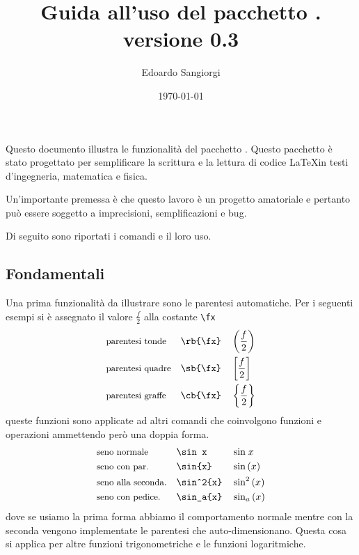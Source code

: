 \documentclass[11pt, a4paper ]{article}
\title{Guida all'uso del pacchetto \LaTeLib.\\[0.5em]  \large versione 0.3}
\author{Edoardo Sangiorgi}
\date{\today}
\def\fx{\frac{f}{2}}
\def\sh{\textbackslash}
\begin{document}
\maketitle
\noindent
Questo documento illustra le funzionalità del pacchetto \LaTeLib.
Questo pacchetto è stato progettato per semplificare la scrittura e la lettura di codice \LaTeX in testi d'ingegneria, matematica e fisica.

Un'importante premessa è che questo lavoro è un progetto amatoriale e pertanto può essere soggetto a imprecisioni, semplificazioni e bug.

Di seguito sono riportati i comandi e il loro uso.

\subsection*{Fondamentali}
Una prima funzionalità da illustrare sono le parentesi automatiche.
Per i seguenti esempi si è assegnato il valore $\frac{f}{2}$ alla costante \texttt{\sh fx}
\begin{align*}
    &\text{\small parentesi tonde} && \texttt{\sh rb\{\sh fx\}} && \rb{\fx}\\
    &\text{\small parentesi quadre} && \texttt{\sh sb\{\sh fx\}} && \sb{\fx}\\
    &\text{\small parentesi graffe} && \texttt{\sh cb\{\sh fx\}} && \cb{\fx}
\end{align*}
queste funzioni sono applicate ad altri comandi che coinvolgono funzioni e operazioni ammettendo però una doppia forma.
\begin{align*}
    &\text{\small seno normale} && \texttt{\sh sin x} && \sin x\\
    &\text{\small seno con par.} && \texttt{\sh sin\{x\}} && \sin{x}\\
    &\text{\small seno alla seconda.} && \texttt{\sh sin\^{}2\{x\}} && \sin^2{x}\\
    &\text{\small seno con pedice.} && \texttt{\sh sin\_a\{x\}} && \sin_a{x}
\end{align*}
dove se usiamo la prima forma abbiamo il comportamento normale mentre con la seconda vengono implementate le parentesi che auto-dimensionano.
Questa cosa si applica per altre funzioni trigonometriche e le funzioni logaritmiche.
\end{document}
